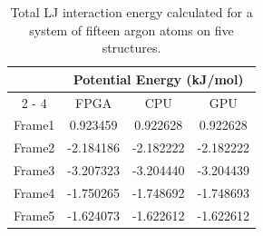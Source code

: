 \documentclass{article}
\begin{document}
\begin{table}[!ht]
	\centering
		\caption[Inert gas in test results]{Total LJ interaction energy calculated for a system of fifteen argon atoms on five structures.}
	\begin{tabular}{cccc}
		\hline
		\multicolumn{1}{l}{} & \multicolumn{3}{c}{Potential Energy (kJ/mol)} \\ \cline{2 - 4}
		& FPGA      & CPU       & GPU       \\ \hline
		Frame1               & 0.923459  & 0.922628  & 0.922628  \\
		Frame2               & -2.184186 & -2.182222 & -2.182222 \\
		Frame3               & -3.207323 & -3.204440 & -3.204439 \\
		Frame4               & -1.750265 & -1.748692 & -1.748693 \\
		Frame5               & -1.624073 & -1.622612 & -1.622612 \\ \hline
	\end{tabular}
	\label{tbl:argon}
\end{table}
\end{document}

